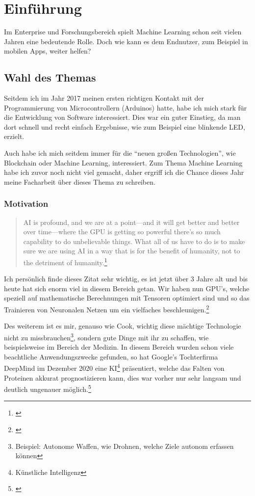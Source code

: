 \section{Einführung}
Im Enterprise und Forschungsbereich spielt Machine Learning schon seit vielen Jahren eine bedeutende Rolle. Doch wie kann es dem Endnutzer, zum Beispiel in mobilen Apps, weiter helfen?

\subsection{Wahl des Themas}

Seitdem ich im Jahr 2017 meinen ersten richtigen Kontakt mit der Programmierung von Microcontrollern (Arduinos) hatte, habe ich mich stark für die Entwicklung von Software interessiert. Dies war ein guter Einstieg, da man dort schnell und recht einfach Ergebnisse, wie zum Beispiel eine blinkende LED, erzielt.

Auch habe ich mich seitdem immer für die "`neuen großen Technologien"', wie Blockchain oder Machine Learning, interessiert. Zum Thema Machine Learning habe ich zuvor noch nicht viel gemacht, daher ergriff ich die Chance dieses Jahr meine Facharbeit über dieses Thema zu schreiben.

\subsubsection{Motivation}

\begin{quotation}
    AI is profound, and we are at a point—and it will get better and better over time—where the GPU is getting so powerful there’s so much capability to do unbelievable things. What all of us have to do is to make sure we are using AI in a way that is for the benefit of humanity, not to the detriment of humanity.\footnote[1]{\cite[Tim Cook (CEO von Apple) In einem Interview mit MIT Technology Review]{timcookquote}}
\end{quotation}

Ich persönlich finde dieses Zitat sehr wichtig, es ist jetzt über 3 Jahre alt und bis heute hat sich enorm viel in diesem Bereich getan. Wir haben nun GPU's, welche speziell auf mathematische Berechnungen mit Tensoren optimiert sind und so das Trainieren von Neuronalen Netzen um ein vielfaches beschleunigen.\footnote[2]{\cite[NVIDIA Grafikprozessoren mit integrierten Tensor Kernen]{nvidiatensorcores}}

Des weiterem ist es mir, genauso wie Cook, wichtig diese mächtige Technologie nicht zu missbrauchen\footnote[3]{Beispiel: Autonome Waffen, wie Drohnen, welche Ziele autonom erfassen können}, sondern gute Dinge mit ihr zu schaffen, wie beispielsweise im Bereich der Medizin. In diesem Bereich wurden schon viele beachtliche Anwendungszwecke gefunden, so hat Google's Tochterfirma DeepMind im Dezember 2020 eine KI\footnote[4]{Künstliche Intelligenz} präsentiert, welche das Falten von Proteinen akkurat prognostizieren kann, dies war vorher nur sehr langsam und deutlich ungenauer möglich.\footnote[5]{\cite{deepmindprotein}}

